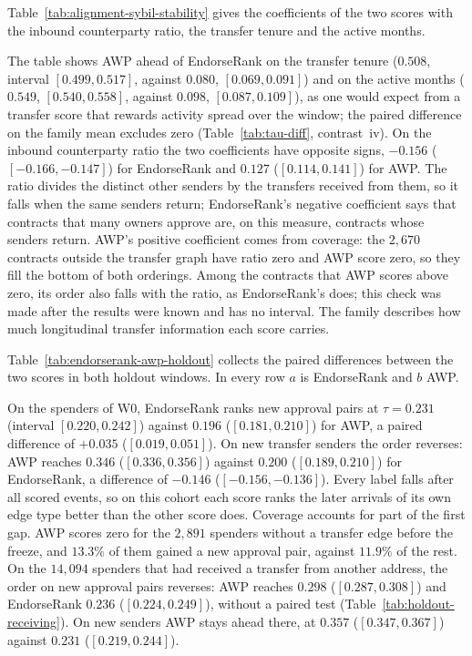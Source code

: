 Table~\ref{tab:alignment-sybil-stability} gives the coefficients of the two scores with the inbound counterparty ratio, the transfer tenure and the active months.



The table shows AWP ahead of EndorseRank on the transfer tenure ($0.508$, interval $[0.499,0.517]$, against $0.080$, $[0.069,0.091]$) and on the active months ($0.549$, $[0.540,0.558]$, against $0.098$, $[0.087,0.109]$), as one would expect from a transfer score that rewards activity spread over the window; the paired difference on the family mean excludes zero (Table~\ref{tab:tau-diff}, contrast~iv). On the inbound counterparty ratio the two coefficients have opposite signs, $-0.156$ ($[-0.166,-0.147]$) for EndorseRank and $0.127$ ($[0.114,0.141]$) for AWP. The ratio divides the distinct other senders by the transfers received from them, so it falls when the same senders return; EndorseRank's negative coefficient says that contracts that many owners approve are, on this measure, contracts whose senders return. AWP's positive coefficient comes from coverage: the $2{,}670$ contracts outside the transfer graph have ratio zero and AWP score zero, so they fill the bottom of both orderings. Among the contracts that AWP scores above zero, its order also falls with the ratio, as EndorseRank's does; this check was made after the results were known and has no interval. The family describes how much longitudinal transfer information each score carries.


Table~\ref{tab:endorserank-awp-holdout} collects the paired differences between the two scores in both holdout windows. In every row $a$ is EndorseRank and $b$ AWP.



On the spenders of W0, EndorseRank ranks new approval pairs at $\tau=0.231$ (interval $[0.220,0.242]$) against $0.196$ ($[0.181,0.210]$) for AWP, a paired difference of $+0.035$ ($[0.019,0.051]$). On new transfer senders the order reverses: AWP reaches $0.346$ ($[0.336,0.356]$) against $0.200$ ($[0.189,0.210]$) for EndorseRank, a difference of $-0.146$ ($[-0.156,-0.136]$). Every label falls after all scored events, so on this cohort each score ranks the later arrivals of its own edge type better than the other score does. Coverage accounts for part of the first gap. AWP scores zero for the $2{,}891$ spenders without a transfer edge before the freeze, and $13.3\%$ of them gained a new approval pair, against $11.9\%$ of the rest. On the $14{,}094$ spenders that had received a transfer from another address, the order on new approval pairs reverses: AWP reaches $0.298$ ($[0.287,0.308]$) and EndorseRank $0.236$ ($[0.224,0.249]$), without a paired test (Table~\ref{tab:holdout-receiving}). On new senders AWP stays ahead there, at $0.357$ ($[0.347,0.367]$) against $0.231$ ($[0.219,0.244]$).

